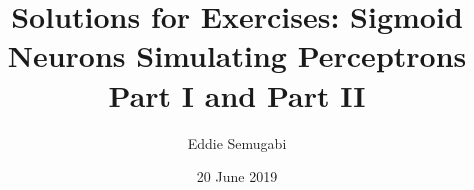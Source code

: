 \documentclass[a4paper,12pt]{article}
\begin{document}
\title{Solutions for Exercises: Sigmoid Neurons
Simulating Perceptrons Part I and Part II}
\author{Eddie Semugabi}
\date{20 June 2019}
\maketitle
\end{document}

